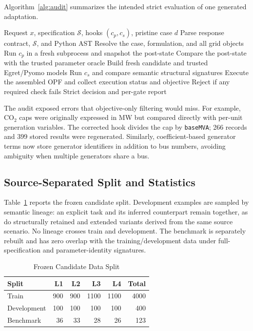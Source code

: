 \documentclass[lettersize,journal]{IEEEtran}
\begin{document}
Algorithm~\ref{alg:audit} summarizes the intended strict evaluation of one generated adaptation.

\begin{algorithm}[!t]
\caption{Strict Evaluation of One Generated OPF Adaptation}
\label{alg:audit}
\begin{algorithmic}[1]
\REQUIRE Request $x$, specification $\mathcal S$, hooks $(c_p,c_s)$, pristine case $d$
\STATE Parse response contract, $\mathcal S$, and Python AST
\STATE Resolve the case, formulation, and all grid objects
  \STATE Run $c_p$ in a fresh subprocess and snapshot the post-state
  \STATE Compare the post-state with the trusted parameter oracle
  \STATE Build fresh candidate and trusted Egret/Pyomo models
  \STATE Run $c_s$ and compare semantic structural signatures
  \STATE Execute the assembled OPF and collect execution status and objective
  \STATE Reject if any required check fails
\ENDFOR
\RETURN Strict decision and per-gate report
\end{algorithmic}
\end{algorithm}

The audit exposed errors that objective-only filtering would miss. For example, CO$_2$ caps were originally expressed in MW but compared directly with per-unit generation variables. The corrected hook divides the cap by \texttt{baseMVA}; 266 records and 399 stored results were regenerated. Similarly, coefficient-based generator terms now store generator identifiers in addition to bus numbers, avoiding ambiguity when multiple generators share a bus.

\subsection{Source-Separated Split and Statistics}
Table~\ref{tab:data-split} reports the frozen candidate split. Development examples are sampled by semantic lineage: an explicit task and its inferred counterpart remain together, as do structurally retained and extended variants derived from the same source scenario. No lineage crosses train and development. The benchmark is separately rebuilt and has zero overlap with the training/development data under full-specification and parameter-identity signatures.

\begin{table}[!t]
\caption{Frozen Candidate Data Split}
\label{tab:data-split}
\centering
\footnotesize
\begin{tabular}{@{}lrrrrr@{}}
\toprule
Split & L1 & L2 & L3 & L4 & Total \\
\midrule
Train & 900 & 900 & 1100 & 1100 & 4000 \\
Development & 100 & 100 & 100 & 100 & 400 \\
Benchmark & 36 & 33 & 28 & 26 & 123 \\
\bottomrule
\end{tabular}
\end{table}
\end{document}
